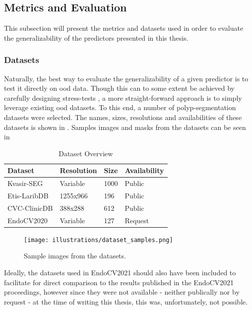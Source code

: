 \subsection{Metrics and Evaluation} \label{metrics}
    This subsection will present the metrics and datasets used in order to evaluate the generalizability of the predictors presented in this thesis.  

    \subsubsection{Datasets} \label{datasets}
    Naturally, the best way to evaluate the generalizability of a given predictor is to test it directly on \gls{ood} data. Though this can to some extent be achieved by carefully designing stress-tests \cite{damour2020underspecification}, a more straight-forward approach is to simply leverage existing \gls{ood} datasets. To this end, a number of polyp-segmentation datasets were selected. The names, sizes, resolutions and availabilities of these datasets is shown in . Samples images and masks from the datasets can be seen in 
    
    \begin{table}[h!]
        \centering
       \begin{tabularx}{\linewidth}{lXXX}
        \toprule
        Dataset & Resolution & Size & Availability \\
        \midrule
        Kvasir-SEG \cite{kvasir} & Variable & 1000 & Public \\
        Etis-LaribDB \cite{etis-larib} & 1255x966 & 196  & Public \\
        CVC-ClinicDB \cite{cvc-clinic} & 388x288 & 612  & Public \\
        EndoCV2020 \cite{endocv2020} & Variable & 127  & Request \\
        \bottomrule
    \end{tabularx}
        \caption{Dataset Overview}
        \label{tab:datasets}
    \end{table}
    
    \begin{figure}[h!]
        \centering
        \texttt{[image: illustrations/dataset\_samples.png]}
        \caption{Sample images from the datasets.}
        \label{fig:dataset_examples}
    \end{figure}
    
    Ideally, the datasets used in EndoCV2021 \cite{endocv2021} should also have been included to facilitate for direct comparison to the results published in the EndoCV2021 proceedings, however since they were not available - neither publically nor by request - at the time of writing this thesis, this was, unfortunately, not possible. 
    
